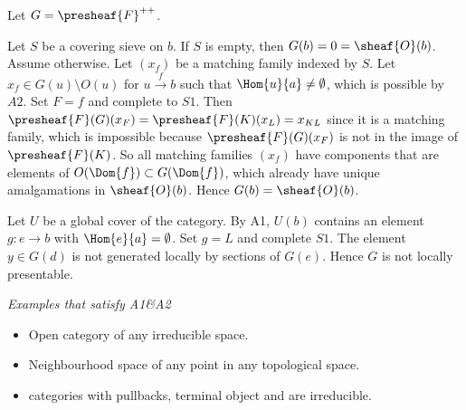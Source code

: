 \begin{example}
Let $G = \presheaf{F}^{++}$.



Let $S$ be a covering sieve on $b$. If $S$ is empty, then $G(b) = 0 = \sheaf{O}(b)$.
Assume otherwise.
Let $(x_f)$ be a matching family indexed by $S$.
Let $x_f\in G(u)\setminus O(u)$ for $u\xrightarrow{f} b$ such that $\Hom{u}{a} \neq \emptyset$, 
which is possible by $A2$. Set $F=f$ and complete to $S1$. Then $\presheaf{F}(G)(x_F)= \presheaf{F}(K)(x_L) = x_{KL}$ since it is a matching family,
which is impossible because $\presheaf{F}(G)(x_F)$ is not in the image of $\presheaf{F}(K)$.
So all matching families $(x_f)$ have components that are elements of $O(\Dom{f})\subset G(\Dom{f})$, 
which already have unique amalgamations in $\sheaf{O}(b)$. 
Hence $G(b)= \sheaf{O}(b)$.

Let $U$ be a global cover of the category.
By A1, $U(b)$ contains an element $g:e\rightarrow b$ with $\Hom{e}{a} = \emptyset$.
Set $g=L$ and complete $S1$.
The element $y\in G(d)$ is not generated locally by sections of $G(e)$.
Hence $G$ is not locally presentable.

\emph{Examples that satisfy A1\&A2}
\begin{itemize}
\item Open category of any irreducible space.
\item Neighbourhood space of any point in any topological space.
\item categories with pullbacks, terminal object and are irreducible.
\end{itemize}
\end{example}